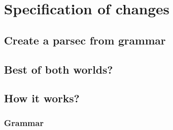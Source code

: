 \section{Specification of changes}

\subsection{Create a parsec from grammar}

\subsection{Best of both worlds?}

\subsection{How it works?}

\subsubsection{Grammar}
